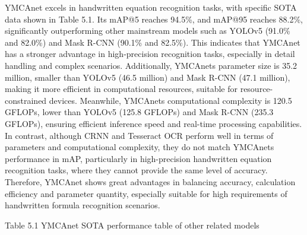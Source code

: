 \documentclass[
]{article}
\begin{document}
YMCAnet excels in handwritten equation recognition tasks, with specific
SOTA data shown in Table 5.1. Its mAP@5 reaches 94.5\%, and mAP@95
reaches 88.2\%, significantly outperforming other mainstream models such
as YOLOv5 (91.0\% and 82.0\%) and Mask R-CNN (90.1\% and 82.5\%). This
indicates that YMCAnet has a stronger advantage in high-precision
recognition tasks, especially in detail handling and complex scenarios.
Additionally, YMCAnet\textquotesingle s parameter size is 35.2 million,
smaller than YOLOv5 (46.5 million) and Mask R-CNN (47.1 million), making
it more efficient in computational resources, suitable for
resource-constrained devices. Meanwhile, YMCAnet\textquotesingle s
computational complexity is 120.5 GFLOPs, lower than YOLOv5 (125.8
GFLOPs) and Mask R-CNN (235.3 GFLOPs), ensuring efficient inference
speed and real-time processing capabilities. In contrast, although CRNN
and Tesseract OCR perform well in terms of parameters and computational
complexity, they do not match YMCAnet\textquotesingle s performance in
mAP, particularly in high-precision handwritten equation recognition
tasks, where they cannot provide the same level of accuracy. Therefore,
YMCAnet shows great advantages in balancing accuracy, calculation
efficiency and parameter quantity, especially suitable for high
requirements of handwritten formula recognition scenarios.

Table 5.1 YMCAnet SOTA performance table of other related models
\end{document}
